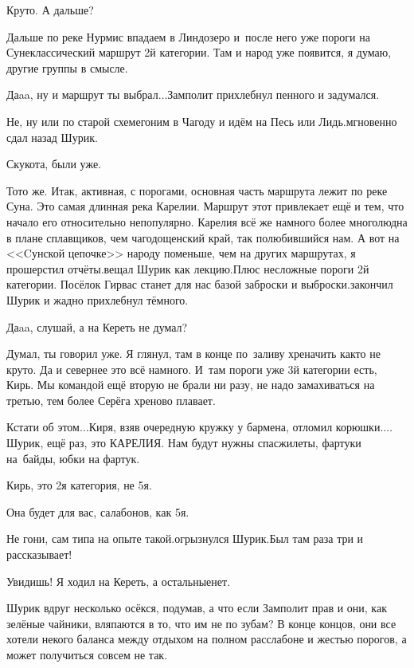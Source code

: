 \diagdash Круто. А дальше? 

\diagdash Дальше по реке Нурмис впадаем в Линдозеро и~после него уже пороги на Суне\mdash классический маршрут 2\sdash й категории. Там и народ уже появится, я думаю, другие группы в смысле.

\diagdash Да\sdash a\sdash a, ну и маршрут ты выбрал$\ldots$\mdash Замполит прихлебнул пенного и задумался.

\diagdash Не, ну или по старой схеме\mdash гоним в Чагоду и идём на Песь или Лидь.\mdash мгновенно сдал назад Шурик.

\diagdash Скукота, были уже.

\diagdash То\sdash то же. Итак, активная, с порогами, основная часть маршрута лежит по реке Суна. Это самая длинная река Карелии. Маршрут этот привлекает ещё и тем, что начало его относительно непопулярно. Карелия всё же намного более многолюдна в плане сплавщиков, чем чагодощенский край, так полюбившийся нам. А вот на <<Cунской цепочке>> народу поменьше, чем на других маршрутах, я прошерстил отчёты.\mdash вещал Шурик как лекцию.\mdash Плюс несложные пороги 2\sdash й категории. Посёлок Гирвас станет для нас базой заброски и выброски.\mdash закончил Шурик и жадно прихлебнул тёмного.

\diagdash Да\sdash a\sdash a, слушай, а на Кереть не думал?

\diagdash Думал, ты говорил уже. Я глянул, там в конце по~заливу хреначить как\sdash то не круто. Да и севернее это всё намного. И~там пороги уже 3\sdash й категории есть, Кирь. Мы командой ещё вторую не брали ни разу, не надо замахиваться на третью, тем более Серёга хреново плавает. 

\diagdash Кстати об этом$\ldots$\mdash Киря, взяв очередную кружку у бармена, отломил корюшки.\mdash $\ldots$Шурик, ещё раз, это КАРЕЛИЯ. Нам будут нужны спасжилеты, фартуки на~байды, юбки на фартук.

\diagdash Кирь, это 2\sdash я категория, не 5\sdash я.

\diagdash Она будет для вас, салабонов, как 5\sdash я.

\diagdash Не гони, сам типа на опыте такой.\mdash огрызнулся Шурик.\mdash Был там раза три и рассказывает!

\diagdash Увидишь! Я ходил на Кереть, а остальные\mdash нет.

Шурик вдруг несколько осёкся, подумав, а что если Замполит прав и они, как зелёные чайники, вляпаются в то, что им не по зубам? В конце концов, они все хотели некого баланса между отдыхом на полном расслабоне и жестью порогов, а может получиться совсем не так.

